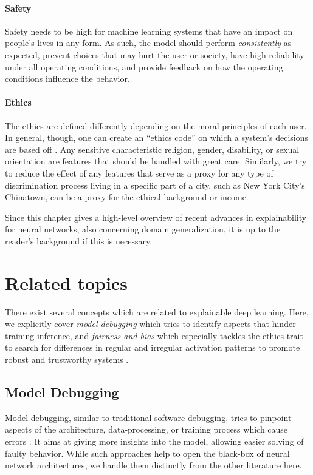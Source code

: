 \paragraph{Safety}
Safety needs to be high for machine learning systems that have an impact on people's lives in any form. As such, the model should perform \emph{consistently} as expected, prevent choices that may hurt the user or society, have high reliability under all operating conditions, and provide feedback on how the operating conditions influence the behavior.

\paragraph{Ethics}
The ethics are defined differently depending on the moral principles of each user. In general, though, one can create an ``ethics code'' on which a system's decisions are based off \citep{xie2020explainable}. Any sensitive characteristic \eg  religion, gender, disability, or sexual orientation are features that should be handled with great care. Similarly, we try to reduce the effect of any features that serve as a proxy for any type of discrimination process \eg living in a specific part of a city, such as New York City's Chinatown, can be a proxy for the ethical background or income. 

Since this chapter gives a high-level overview of recent advances in explainability for neural networks, also concerning domain generalization, it is up to the reader's background if this is necessary. 

\section{Related topics}
There exist several concepts which are related to explainable deep learning. Here, we explicitly cover \emph{model debugging} which tries to identify aspects that hinder training inference, and \emph{fairness and bias} which especially tackles the ethics trait to search for differences in regular and irregular activation patterns to promote robust and trustworthy systems \citep{xie2020explainable}. 

\subsection{Model Debugging}
Model debugging, similar to traditional software debugging, tries to pinpoint aspects of the architecture, data-processing, or training process which cause errors \citep{xie2020explainable}. It aims at giving more insights into the model, allowing easier solving of faulty behavior. While such approaches help to open the black-box of neural network architectures, we handle them distinctly from the other literature here. 


